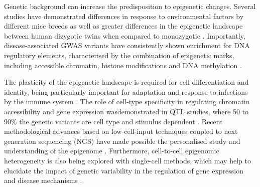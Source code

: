 Genetic background can increase the predisposition to epigenetic changes. Several studies have demonstrated differences in response to environmental factors by different mice breeds as well as greater differences in the epigenetic landscape between human dizygotic twins when compared to monozygotic \parencite{Pogribny2009,Kaminsky2009}. Importantly, disease-associated GWAS variants have consistently shown enrichment for DNA regulatory elements, characterised by the combination of epigenetic marks, including accessible chromatin, histone modifications and DNA methylation \parencite{Trynka2013,Trynka2013b,Gusev2014}. 

The plasticity of the epigenetic landscape is required for cell differentiation and identity, being particularly important for adaptation and response to infections by the immune system \parencite{Yosef2016}. The role of cell-type specificity in regulating chromatin accessibility and gene expression  wasdemonstrated in QTL studies, where 50 to 90\% the genetic variants are cell type and stimulus dependent \parencite{Dimas2009,Nica2011,Fairfax2012,Fairfax2014,Raj2014,Naranbhai2015,Kasela2017}. Recent methodological advances based on low-cell-input techniques coupled to next generation sequencing (NGS) have made possible the personalised study and understanding of the epigenome \parencite{Buenrostro2013, Schmidl2015,Oudelaar2017}. Furthermore, cell-to-cell epigenomic heterogeneity is also being explored with single-cell methods, which may help to elucidate the impact of genetic variability in the regulation of gene expression and disease mechanisms \parencite{Buenrostro2015, Cusanovich2015,Rotem2015,Nagano2013,Smallwood2014}.


